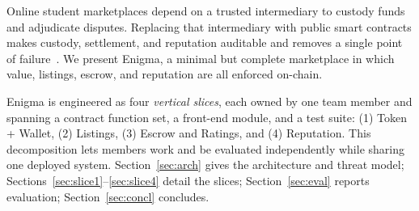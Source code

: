 Online student marketplaces depend on a trusted intermediary to custody funds and adjudicate disputes. Replacing that intermediary with public smart contracts makes custody, settlement, and reputation auditable and removes a single point of failure~\cite{nakamoto2008bitcoin,buterin2014ethereum}. We present Enigma, a minimal but complete marketplace in which value, listings, escrow, and reputation are all enforced on-chain.

Enigma is engineered as four \emph{vertical slices}, each owned by one team member and spanning a contract function set, a front-end module, and a test suite: (1) Token + Wallet, (2) Listings, (3) Escrow and Ratings, and (4) Reputation. This decomposition lets members work and be evaluated independently while sharing one deployed system. Section~\ref{sec:arch} gives the architecture and threat model; Sections~\ref{sec:slice1}--\ref{sec:slice4} detail the slices; Section~\ref{sec:eval} reports evaluation; Section~\ref{sec:concl} concludes.
